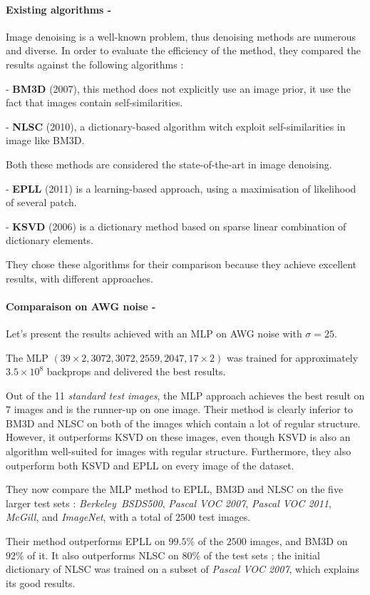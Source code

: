\documentclass[10pt,a4paper]{article}
\newcommand{\svs}{\vspace{9pt}}
\newcommand{\ourparagraph}[1]{\paragraph{#1}}
\begin{document}
\ourparagraph{Existing algorithms -}{

Image denoising is a well-known problem, thus denoising methods are numerous and diverse. In order to evaluate the efficiency of the method, they compared the results against the following algorithms :

\svs
- \textbf{BM3D} (2007), this method does not explicitly use an image prior, it use the fact that images contain self-similarities.

- \textbf{NLSC} (2010), a dictionary-based algorithm witch exploit self-similarities in image like BM3D.

Both these methods are considered the state-of-the-art in image denoising.

- \textbf{EPLL} (2011) is a learning-based approach, using a maximisation of likelihood of several patch.

- \textbf{KSVD} (2006) is a dictionary method based on sparse linear combination of dictionary elements.
\svs

They chose these algorithms for their comparison because they achieve excellent results, with different approaches.}

\ourparagraph{Comparaison on AWG noise -}{
Let's present the results achieved with an MLP on AWG noise with $\sigma=25$.

\svs 

The MLP $(39 \times 2, 3072, 3072, 2559, 2047, 17 \times 2)$ was trained for approximately $3.5 \times 10^8$ backprops and delivered the best results.

\svs 

Out of the 11 \textit{standard test images}, the MLP approach achieves the best result on 7 images and is the runner-up on one image.
Their method is clearly inferior to BM3D and NLSC on both of the images which contain a lot of regular structure. However, it outperforms KSVD on these images, even though KSVD is also an algorithm well-suited for images with regular structure. Furthermore, they also outperform both KSVD and EPLL on every image of the dataset.

\svs

They now compare the MLP method to EPLL, BM3D and NLSC on the five larger test sets : \textit{Berkeley\ BSDS500}, \textit{Pascal VOC 2007}, \textit{Pascal VOC 2011}, \textit{McGill}, and \textit{ImageNet}, with a total of $2500$ test images.

\svs

Their method outperforms EPLL on $99.5\%$ of the $2500$ images, and BM3D on $92\%$ of it. It also outperforms NLSC on $80\%$ of the test sets ; the initial dictionary of NLSC was trained on a subset of \textit{Pascal VOC 2007}, which explains its good results.}
\end{document}
